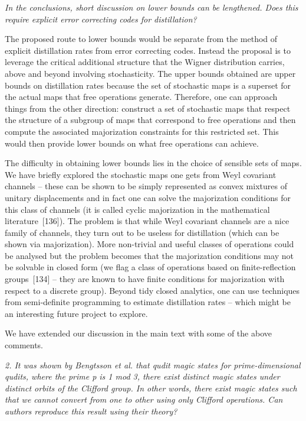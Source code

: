 \documentclass[11pt]{letter}
\begin{document}
\textit{In the conclusions, short discussion on lower bounds can be lengthened. Does this require explicit error correcting codes for distillation?}

The proposed route to lower bounds would be separate from the method of explicit distillation rates from error correcting codes.  Instead the proposal is to leverage the critical additional structure that the Wigner distribution carries,  above and beyond involving stochasticity.  The upper bounds obtained are upper bounds on distillation rates because the set of stochastic maps is a superset for the actual maps that free operations generate.  
Therefore, one can approach things from the other direction: construct a set of stochastic maps that respect the structure of a subgroup of maps that correspond to free operations and then compute the associated majorization constraints for this restricted set. This would then provide lower bounds on what free operations can achieve. 

The difficulty in obtaining lower bounds lies in the choice of sensible sets of maps. 
We have briefly explored the stochastic maps one gets from Weyl covariant channels -- these can be shown to be simply represented as convex mixtures of unitary displacements and in fact one can solve the majorization conditions for this class of channels (it is called cyclic majorization in the mathematical literature~[136]). The problem is that while Weyl covariant channels are a nice family of channels,  they turn out to be useless for distillation (which can be shown via majorization). 
More non-trivial and useful classes of operations could be analysed but the problem becomes that the majorization conditions may not be solvable in closed form (we flag a class of operations based on finite-reflection groups~[134] -- they are known to have finite conditions for majorization with respect to a discrete group). Beyond tidy closed analytics, one can use techniques from semi-definite programming to estimate distillation rates -- which might be an interesting future project to explore.

We have extended our discussion in the main text with some of the above comments.

\textit{2. It was shown by Bengtsson et al. that qudit magic states for prime-dimensional qudits, where the prime p is 1 mod 3, there exist distinct magic states under distinct orbits of the Clifford group. In other words, there exist magic states such that we cannot convert from one to other using only Clifford operations. Can authors reproduce this result using their theory?}
\end{document}

